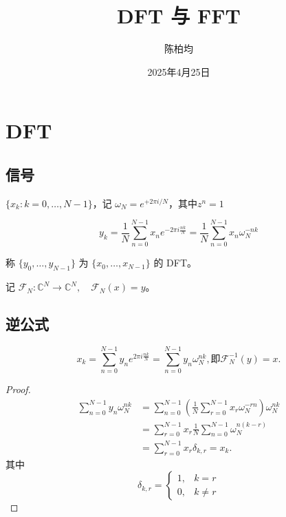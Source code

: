 \documentclass[12pt,a4paper]{article}
\title{DFT 与 FFT}
\author{陈柏均}
\date{2025年4月25日}
\newcommand{\C}{\mathbb{C}}
\numberwithin{subsection}{section}   %
\numberwithin{subsubsection}{subsection}
\theoremstyle{plain}
\theoremstyle{definition}
\theoremstyle{remark}
\theoremstyle{remark}
\begin{document}
	\maketitle
	
	\section{DFT}
	
	\subsection{信号}
	 $\{x_k: k=0,\dots,N-1\}$，记 $\omega_N = e^{+2\pi i / N}$，其中$z^n=1$
	
	\begin{equation}
		y_k = \frac{1}{N} \sum_{n=0}^{N-1} x_n e^{-2\pi i \frac{nk}{N}} = \frac{1}{N} \sum_{n=0}^{N-1} x_n \omega_N^{-nk}
	\end{equation}
	
	称 $\{y_0,\dots,y_{N-1}\}$ 为 $\{x_0,\dots,x_{N-1}\}$ 的 DFT。
	
	记 $\mathcal{F}_N: \C^N \rightarrow \C^N,\quad \mathcal{F}_N(x) = y$。
	

		\subsection{ 逆公式}
		
		\begin{equation}
			x_k = \sum_{n=0}^{N-1} y_n e^{2\pi i \frac{nk}{N}} = \sum_{n=0}^{N-1} y_n \omega_N^{nk}, \text{即} \mathcal{F}_N^{-1}(y) = x.
		\end{equation}
		
		\begin{proof}
	\begin{equation}
		\begin{aligned}
			\sum_{n=0}^{N-1} y_n \omega_N^{nk} 
			&= \sum_{n=0}^{N-1} \left( \frac{1}{N} \sum_{r=0}^{N-1} x_r \omega_N^{-rn} \right) \omega_N^{nk} \\[8pt]
			&= \sum_{r=0}^{N-1} x_r \frac{1}{N} \sum_{n=0}^{N-1} \omega_N^{n(k - r)} \\[8pt]
			&= \sum_{r=0}^{N-1} x_r \delta_{k,r} = x_k.
		\end{aligned}
	\end{equation}
		其中
			\begin{equation}
				\delta_{k,r} = 
				\begin{cases} 
					1, & k = r \\[8pt]
					0, & k \neq r 
				\end{cases}
			\end{equation}
			
\end{proof}
\end{document}
